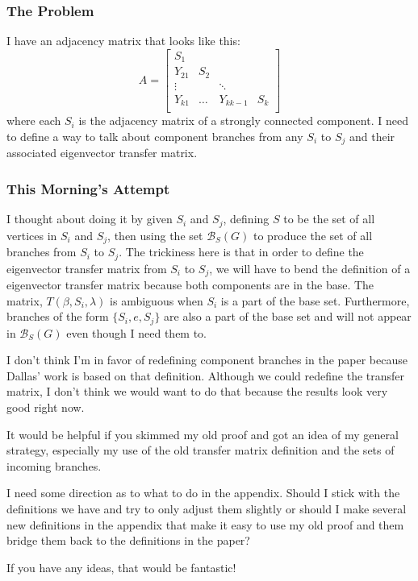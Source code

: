\documentclass{paper}
\begin{document}
\subsubsection*{The Problem}
I have an adjacency matrix that looks like this:
\[
A = 
\begin{bmatrix}
S_1 \\
Y_{21} & S_2 \\
\vdots & & \ddots \\
Y_{k1} & \hdots & Y_{kk-1} & S_k \\
\end{bmatrix}
\]
where each $S_i$ is the adjacency matrix of a strongly connected component. I need to define a way to talk about component branches from any $S_i$ to $S_j$ and their associated eigenvector transfer matrix.

\subsubsection*{This Morning's Attempt}
I thought about doing it by given $S_i$ and $S_j$, defining $S$ to be the set of all vertices in $S_i$ and $S_j$, then using the set $\mathcal{B}_S(G)$ to produce the set of all branches from $S_i$ to $S_j$. The trickiness here is that in order to define the eigenvector transfer matrix from $S_i$ to $S_j$, we will have to bend the definition of a eigenvector transfer matrix because both components are in the base. The matrix, $T(\beta,S_i,\lambda)$ is ambiguous when $S_i$ is a part of the base set. Furthermore, branches of the form $\{S_i, e, S_j\}$ are also a part of the base set and will not appear in  $\mathcal{B}_S(G)$ even though I need them to.

I don't think I'm in favor of redefining component branches in the paper because Dallas' work is based on that definition. Although we could redefine the transfer matrix, I don't think we would want to do that because the results look very good right now. 

It would be helpful if you skimmed my old proof and got an idea of my general strategy, especially my use of the old transfer matrix definition and the sets of incoming branches.

I need some direction as to what to do in the appendix. Should I stick with the definitions we have and try to only adjust them slightly or should I make several new definitions in the appendix that make it easy to use my old proof and them bridge them back to the definitions in the paper?

If you have any ideas, that would be fantastic!
\end{document}
